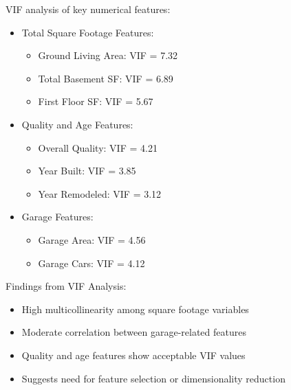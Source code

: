 \documentclass[12pt]{report}
\begin{document}
VIF analysis of key numerical features:
\begin{itemize}
    \item Total Square Footage Features:
    \begin{itemize}
        \item Ground Living Area: VIF = 7.32
        \item Total Basement SF: VIF = 6.89
        \item First Floor SF: VIF = 5.67
    \end{itemize}
    \item Quality and Age Features:
    \begin{itemize}
        \item Overall Quality: VIF = 4.21
        \item Year Built: VIF = 3.85
        \item Year Remodeled: VIF = 3.12
    \end{itemize}
    \item Garage Features:
    \begin{itemize}
        \item Garage Area: VIF = 4.56
        \item Garage Cars: VIF = 4.12
    \end{itemize}
\end{itemize}

Findings from VIF Analysis:
\begin{itemize}
    \item High multicollinearity among square footage variables
    \item Moderate correlation between garage-related features
    \item Quality and age features show acceptable VIF values
    \item Suggests need for feature selection or dimensionality reduction
\end{itemize}
\end{document}
